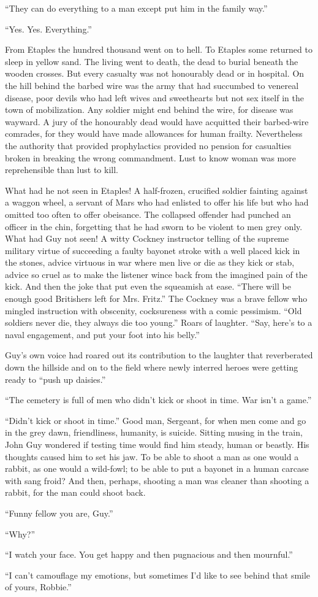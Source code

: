 ``They can do everything to a man except put him in the family way.''

``Yes. Yes. Everything.''

From Etaples the hundred thousand went on to hell. To Etaples some returned to sleep in 
yellow sand. The living went to death, the dead to burial beneath the wooden crosses. But 
every casualty was not honourably dead or in hospital. On the hill behind the barbed wire 
was the army that had succumbed to venereal disease, poor devils who had left wives and 
sweethearts but not sex itself in the town of mobilization. Any soldier might end behind 
the wire, for disease was wayward. A jury of the honourably dead would have acquitted their 
barbed-wire comrades, for they would have made allowances for human frailty. Nevertheless 
the authority that provided prophylactics provided no pension for casualties broken in 
breaking the wrong commandment. Lust to know woman was more reprehensible than lust to kill.

What had he not seen in Etaples! A half-frozen, crucified soldier fainting against a waggon 
wheel, a servant of Mars who had enlisted to offer his life but who had omitted too often 
to offer obeisance. The collapsed offender had punched an officer in the chin, forgetting 
that he had sworn to be violent to men grey only. What had Guy not seen! A witty Cockney 
instructor telling of the supreme military virtue of succeeding a faulty bayonet stroke 
with a well placed kick in the stones, advice virtuous in war where men live or die as they 
kick or stab, advice so cruel as to make the listener wince back from the imagined pain of 
the kick. And then the joke that put even the squeamish at ease. ``There will be enough 
good Britishers left for Mrs. Fritz.'' The Cockney was a brave fellow who mingled instruction 
with obscenity, cocksureness with a comic pessimism. ``Old soldiers never die, they always 
die too young.'' Roars of laughter. ``Say, here's to a naval engagement, and put your foot 
into his belly.''

Guy's own voice had roared out its contribution to the laughter that reverberated down 
the hillside and on to the field where newly interred heroes were getting ready to 
``push up daisies.''

``The cemetery is full of men who didn't kick or shoot in time. War isn't a game.''

``Didn't kick or shoot in time.'' Good man, Sergeant, for when men come and go in the grey 
dawn, friendliness, humanity, is suicide. Sitting musing in the train, John Guy wondered if 
testing time would find him steady, human or beastly. His thoughts caused him to set his 
jaw. To be able to shoot a man as one would a rabbit, as one would a wild-fowl; to be able to 
put a bayonet in a human carcase with sang froid? And then, perhaps, shooting a man was 
cleaner than shooting a rabbit, for the man could shoot back.

``Funny fellow you are, Guy.''

``Why?''

``I watch your face. You get happy and then pugnacious and then mournful.''

``I can't camouflage my emotions, but sometimes I'd like to see behind that smile of yours, 
Robbie.''